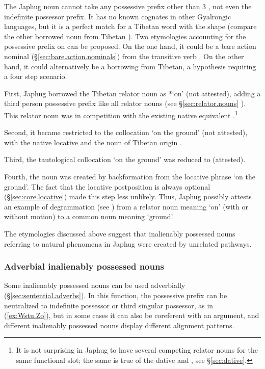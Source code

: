 The Japhug noun  cannot take any possessive prefix other than 3\sg{} , not even the indefinite possessor prefix. It has no known cognates in other Gyalrongic languages, but it is a perfect match for a Tibetan word with the shape  (compare the other borrowed noun  from Tibetan ). Two etymologies accounting for the possessive prefix on  can be proposed. On the one hand, it could be a bare action nominal (§\ref{sec:bare.action.nominals}) from the transitive verb . On the other hand, it could alternatively be a borrowing from Tibetan, a hypothesis requiring a four step scenario.

First, Japhug borrowed the Tibetan relator noun  as  *`on' (not attested), adding a third person possessive prefix like all relator nouns (see §\ref{sec:relator.nouns} ). This relator noun was in competition with the existing native equivalent .\footnote{It is not surprising in Japhug to have several competing relator nouns for the same functional slot; the same is true of the dative  and , see §\ref{sec:dative}. }
 
Second, it became restricted to the collocation  `on the ground' (not attested), with the native locative  and the noun of Tibetan origin .
  
Third, the tautological collocation  `on the ground' was reduced to  (attested).
 
Fourth, the noun  was created by backformation from the locative phrase  `on the ground'. The fact that the locative postposition  is always optional (§\ref{sec:core.locative}) made this step less unlikely. Thus, Japhug possibly attests an example of degrammation (see \citealt[135]{norde09degrammaticalization}) from a relator noun meaning `on' (with or without motion) to a common noun meaning `ground'. 

The etymologies discussed above suggest that inalienably possessed nouns referring to natural phenomena in Japhug were created by unrelated pathways.

\subsubsection{Adverbial inalienably possessed nouns} \label{sec.IPN.adverbs}
Some inalienably possessed nouns can be used adverbially (§\ref{sec:sentential.adverbs}). In this function, the possessive prefix can be neutralized to indefinite possessor or third singular possessor, as  in (\ref{ex:Wstu.Zo}), but in some cases it can also be coreferent with an argument, and different inalienably possessed nouns display different alignment patterns.

